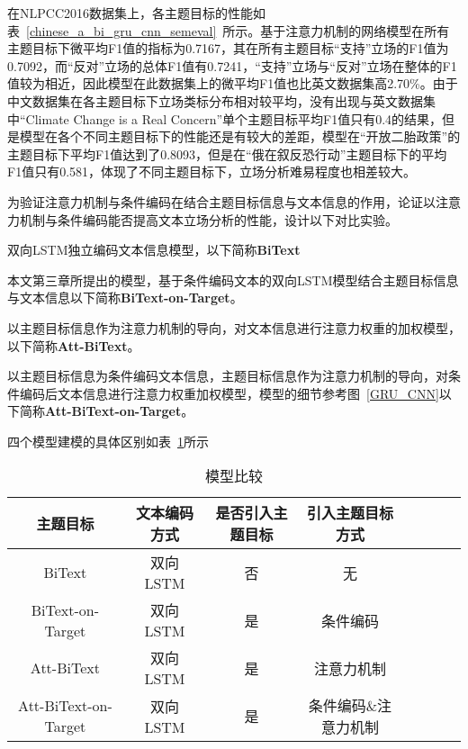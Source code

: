 在NLPCC2016数据集上，各主题目标的性能如表~\ref{chinese_a_bi_gru_cnn_semeval}~所示。基于注意力机制的网络模型在所有主题目标下微平均F1值的指标为0.7167，其在所有主题目标“支持”立场的F1值为0.7092，而“反对”立场的总体F1值有0.7241，“支持”立场与“反对”立场在整体的F1值较为相近，因此模型在此数据集上的微平均F1值也比英文数据集高2.70\%。由于中文数据集在各主题目标下立场类标分布相对较平均，没有出现与英文数据集中“Climate Change is a Real Concern”单个主题目标平均F1值只有0.4的结果，但是模型在各个不同主题目标下的性能还是有较大的差距，模型在“开放二胎政策”的主题目标下平均F1值达到了0.8093，但是在“俄在叙反恐行动”主题目标下的平均F1值只有0.581，体现了不同主题目标下，立场分析难易程度也相差较大。


为验证注意力机制与条件编码在结合主题目标信息与文本信息的作用，论证以注意力机制与条件编码能否提高文本立场分析的性能，设计以下对比实验。

双向LSTM独立编码文本信息模型，以下简称\textbf{BiText}

本文第三章所提出的模型，基于条件编码文本的双向LSTM模型结合主题目标信息与文本信息以下简称\textbf{BiText-on-Target}。

以主题目标信息作为注意力机制的导向，对文本信息进行注意力权重的加权模型，以下简称\textbf{Att-BiText}。

以主题目标信息为条件编码文本信息，主题目标信息作为注意力机制的导向，对条件编码后文本信息进行注意力权重加权模型，模型的细节参考图~\ref{GRU_CNN}以下简称\textbf{Att-BiText-on-Target}。

四个模型建模的具体区别如表~\ref{model_list_attention}所示

\begin{table}[htbp]
	\caption[table123]{模型比较}
	\label{model_list_attention}
	\vspace{0.5em}\centering\wuhao
	\begin{tabular}{cccccccc}
		\toprule[1.5pt]
		主题目标&文本编码方式&是否引入主题目标&引入主题目标方式 \\
		\midrule[1pt]
		BiText&双向LSTM&否&无\\
		BiText-on-Target&双向LSTM&是&条件编码\\
		Att-BiText&双向LSTM&是&注意力机制\\
		Att-BiText-on-Target&双向LSTM&是&条件编码\&注意力机制\\
		\bottomrule[1.5pt]
	\end{tabular}
\end{table}

